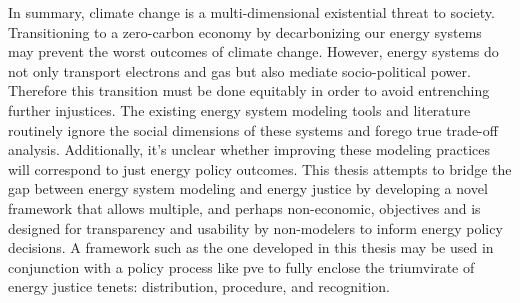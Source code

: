 
In summary, climate change is a multi-dimensional existential threat to society.
Transitioning to a zero-carbon economy by decarbonizing our energy systems may
prevent the worst outcomes of climate change. However, energy systems do not
only transport electrons and gas but also mediate socio-political power.
Therefore this transition must be done equitably in order to avoid entrenching
further injustices. The existing energy system modeling tools and literature
routinely ignore the social dimensions of these systems and forego true
trade-off analysis. Additionally, it's unclear whether improving these modeling
practices will correspond to just energy policy outcomes. This thesis attempts
to bridge the gap between energy system modeling and energy justice by
developing a novel framework that allows multiple, and perhaps non-economic,
objectives and is designed for transparency and usability by non-modelers to
inform energy policy decisions. A framework such as the one developed in this
thesis may be used in conjunction with a policy process like \ac{pve} to fully
enclose the triumvirate of energy justice tenets: distribution, procedure, and
recognition.
